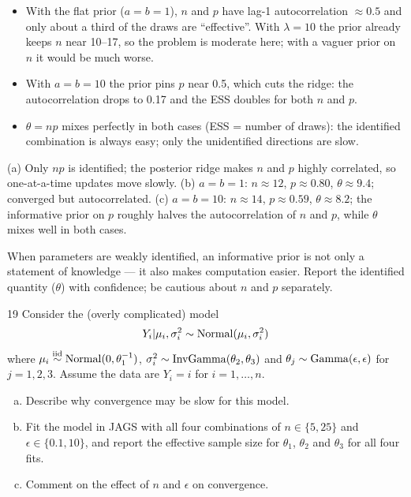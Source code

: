 \documentclass[11pt]{article}
\begin{document}
\begin{itemize}
\item With the flat prior ($a=b=1$), $n$ and $p$ have lag-1 autocorrelation $\approx0.5$ and only about a third of the draws are ``effective''. With $\lambda=10$ the prior already keeps $n$ near 10--17, so the problem is moderate here; with a vaguer prior on $n$ it would be much worse.
\item With $a=b=10$ the prior pins $p$ near 0.5, which cuts the ridge: the autocorrelation drops to 0.17 and the ESS doubles for both $n$ and $p$.
\item $\theta=np$ mixes perfectly in both cases (ESS = number of draws): the identified combination is always easy; only the unidentified directions are slow.
\end{itemize}

\begin{answer}
(a) Only $np$ is identified; the posterior ridge makes $n$ and $p$ highly correlated, so one-at-a-time updates move slowly. (b) $a=b=1$: $n\approx12$, $p\approx0.80$, $\theta\approx9.4$; converged but autocorrelated. (c) $a=b=10$: $n\approx14$, $p\approx0.59$, $\theta\approx8.2$; the informative prior on $p$ roughly halves the autocorrelation of $n$ and $p$, while $\theta$ mixes well in both cases.
\end{answer}

\begin{takeaway}
When parameters are weakly identified, an informative prior is not only a statement of knowledge --- it also makes computation easier. Report the identified quantity ($\theta$) with confidence; be cautious about $n$ and $p$ separately.
\end{takeaway}


\begin{problem}{19}
Consider the (overly complicated) model
\[
Y_i|\mu_i,\sigma_i^2\sim\mathrm{Normal}(\mu_i,\sigma_i^2)
\]
where $\mu_i\stackrel{\text{iid}}{\sim}\mathrm{Normal}(0,\theta_1^{-1})$, $\sigma_i^2\sim\mathrm{InvGamma}(\theta_2,\theta_3)$ and $\theta_j\sim\mathrm{Gamma}(\epsilon,\epsilon)$ for $j=1,2,3$. Assume the data are $Y_i=i$ for $i=1,\dots,n$.
\begin{enumerate}[(a)]
\item Describe why convergence may be slow for this model.
\item Fit the model in JAGS with all four combinations of $n\in\{5,25\}$ and $\epsilon\in\{0.1,10\}$, and report the effective sample size for $\theta_1$, $\theta_2$ and $\theta_3$ for all four fits.
\item Comment on the effect of $n$ and $\epsilon$ on convergence.
\end{enumerate}
\end{problem}
\end{document}
